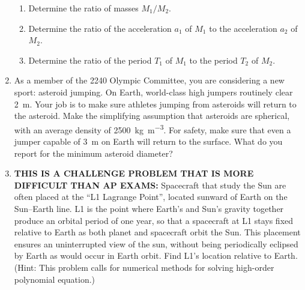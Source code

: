\documentclass{../../oss-apphys}
\begin{document}
\begin{enumerate}[leftmargin=15pt]
\begin{center}
\begin{tikzpicture}[scale=0.8]
    \end{tikzpicture}
  \end{center}
  \begin{enumerate}[noitemsep,leftmargin=20pt]
  \item Determine the ratio of masses $M_1/M_2$.
  \item Determine the ratio of the acceleration $a_1$ of $M_1$ to the
    acceleration $a_2$ of $M_2$.
  \item Determine the ratio of the period $T_1$ of $M _1$ to the period $T_2$
    of $M_2$.
  \end{enumerate}
  \vspace{2.2in}
  
\item As a member of the 2240 Olympic Committee, you are considering a new
  sport: asteroid jumping. On Earth, world-class high jumpers routinely clear
  \SI{2}{\metre}. Your job is to make sure athletes jumping from asteroids will
  return to the asteroid. Make the simplifying assumption that asteroids are
  spherical, with an average density of \SI{2500}{\kilo\gram\per\metre^3}. For
  safety, make sure that even a jumper capable of \SI{3}{\metre} on Earth will
  return to the surface. What do you report for the minimum asteroid diameter?
  \newpage

\item\textbf{THIS IS A CHALLENGE PROBLEM THAT IS MORE DIFFICULT THAN AP EXAMS:}
  Spacecraft that study the Sun are often placed at the ``L1 Lagrange Point'',
  located sunward of Earth on the Sun--Earth line. L1 is the point where Earth's
  and Sun's gravity together produce an orbital period of one year, so that a
  spacecraft at L1 stays fixed relative to Earth as both planet and spacecraft
  orbit the Sun. This placement ensures an uninterrupted view of the sun,
  without being periodically eclipsed by Earth as would occur in Earth orbit.
  Find L1's location relative to Earth. (Hint: This problem calls for numerical
  methods for solving high-order polynomial equation.)
  
\end{enumerate}
\end{document}
